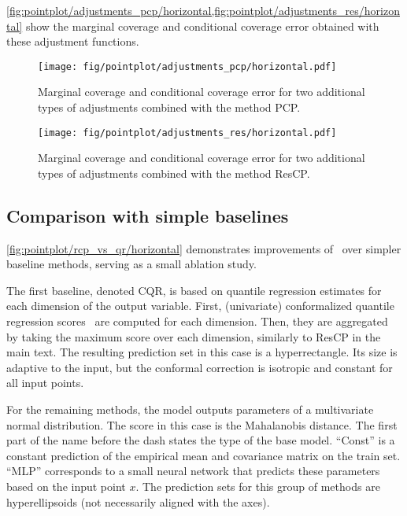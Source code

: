   \cref{fig:pointplot/adjustments_pcp/horizontal,fig:pointplot/adjustments_res/horizontal} show the marginal coverage and conditional coverage error obtained with these adjustment functions.
  

  \begin{figure}[H]
    \centering
    \texttt{[image: fig/pointplot/adjustments\_pcp/horizontal.pdf]}
    \caption{Marginal coverage and conditional coverage error for two additional types of adjustments combined with the method PCP.}
    \label{fig:pointplot/adjustments_pcp/horizontal}
  \end{figure}

  \begin{figure}[H]
    \centering
    \texttt{[image: fig/pointplot/adjustments\_res/horizontal.pdf]}
    \caption{Marginal coverage and conditional coverage error for two additional types of adjustments combined with the method ResCP.}
    \label{fig:pointplot/adjustments_res/horizontal}
  \end{figure}

\newpage
\subsection{Comparison with simple baselines}
\label{sec:simple_baseline}
  \cref{fig:pointplot/rcp_vs_qr/horizontal} demonstrates improvements of \RCP\ over simpler baseline methods, serving as a small ablation study. 

  The first baseline, denoted CQR, is based on quantile regression estimates for each dimension of the output variable. First, (univariate) conformalized quantile regression scores~\cite{romano2019conformalized} are computed for each dimension. Then, they are aggregated by taking the maximum score over each dimension, similarly to ResCP in the main text. The resulting prediction set in this case is a hyperrectangle. Its size is adaptive to the input, but the conformal correction is isotropic and constant for all input points. 

  For the remaining methods, the model outputs parameters of a multivariate normal distribution. The score in this case is the Mahalanobis distance. The first part of the name before the dash states the type of the base model. ``Const'' is a constant prediction of the empirical mean and covariance matrix on the train set. ``MLP'' corresponds to a small neural network that predicts these parameters based on the input point $x$. The prediction sets for this group of methods are hyperellipsoids (not necessarily aligned with the axes).


